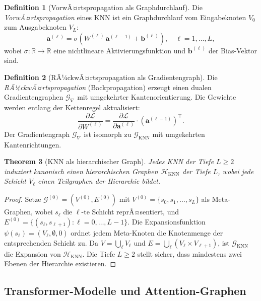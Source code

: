﻿\documentclass[12pt,a4paper]{article}
\theoremstyle{plain}
\newtheorem{theorem}{Theorem}[section]
\theoremstyle{definition}
\newtheorem{definition}[theorem]{Definition}
\theoremstyle{remark}
\newcommand{\GG}{\mathcal{G}}
\newcommand{\HH}{\mathcal{H}}
\newcommand{\RR}{\mathbb{R}}
\newcommand{\KNN}{\text{KNN}}
\begin{document}
\begin{definition}[VorwÃ¤rtspropagation als Graphdurchlauf]
\label{def:forward}
Die \emph{VorwÃ¤rtspropagation} eines KNN ist ein Graphdurchlauf vom Eingabeknoten $V_0$ zum Ausgabeknoten $V_L$:
\[
  \mathbf{a}^{(\ell)} = \sigma\!\left(W^{(\ell)}\, \mathbf{a}^{(\ell-1)} + \mathbf{b}^{(\ell)}\right), \quad \ell = 1, \ldots, L,
\]
wobei $\sigma: \RR \to \RR$ eine nichtlineare Aktivierungsfunktion und $\mathbf{b}^{(\ell)}$ der Bias-Vektor sind.
\end{definition}

\begin{definition}[RÃ¼ckwÃ¤rtspropagation als Gradientengraph]
\label{def:backward}
Die \emph{RÃ¼ckwÃ¤rtspropagation} (Backpropagation) erzeugt einen dualen Gradientengraphen $\GG_{\nabla}$ mit umgekehrter Kantenorientierung. Die Gewichte werden entlang der Kettenregel aktualisiert:
\[
  \frac{\partial \mathcal{L}}{\partial W^{(\ell)}} = \frac{\partial \mathcal{L}}{\partial \mathbf{a}^{(\ell)}} \cdot \left(\mathbf{a}^{(\ell-1)}\right)^\top.
\]
Der Gradientengraph $\GG_\nabla$ ist isomorph zu $\GG_{\KNN}$ mit umgekehrten Kantenrichtungen.
\end{definition}

\begin{theorem}[KNN als hierarchischer Graph]
\label{thm:knn_hierarchisch}
Jedes KNN der Tiefe $L \geq 2$ induziert kanonisch einen hierarchischen Graphen $\HH_{\KNN}$ der Tiefe $L$, wobei jede Schicht $V_\ell$ einen Teilgraphen der Hierarchie bildet.
\end{theorem}

\begin{proof}
Setze $\GG^{(0)} = (V^{(0)}, E^{(0)})$ mit $V^{(0)} = \{s_0, s_1, \ldots, s_L\}$ als Meta-Graphen, wobei $s_\ell$ die $\ell$-te Schicht reprÃ¤sentiert, und $E^{(0)} = \{(s_\ell, s_{\ell+1}) : \ell = 0, \ldots, L-1\}$. Die Expansionsfunktion $\psi(s_\ell) = (V_\ell, \emptyset, 0)$ ordnet jedem Meta-Knoten die Knotenmenge der entsprechenden Schicht zu. Da $V = \bigcup_\ell V_\ell$ und $E = \bigcup_\ell (V_\ell \times V_{\ell+1})$, ist $\GG_{\KNN}$ die Expansion von $\HH_{\KNN}$. Die Tiefe $L \geq 2$ stellt sicher, dass mindestens zwei Ebenen der Hierarchie existieren.
\end{proof}

\subsection{Transformer-Modelle und Attention-Graphen}
\end{document}
